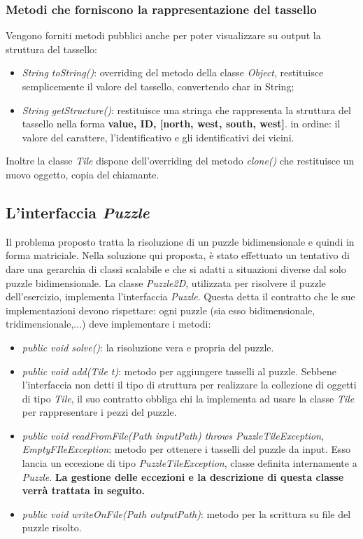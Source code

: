 \documentclass{article}
\begin{document}
\subsubsection{Metodi che forniscono la rappresentazione del tassello}
Vengono forniti metodi pubblici anche per poter visualizzare su output la struttura del tassello:
\begin{itemize}
\item \textit{String toString()}: overriding del metodo della classe \textit{Object}, restituisce semplicemente il valore del tassello, convertendo char in String;
\item \textit{String getStructure()}: restituisce una stringa che rappresenta la struttura del tassello nella forma \textbf{value, ID, [north, west, south, west]}. in ordine: il valore del carattere, l'identificativo e gli identificativi dei vicini.
\end{itemize} 
Inoltre la classe \textit{Tile} dispone dell'overriding del metodo \textit{clone()} che restituisce un nuovo oggetto, copia del chiamante.

\subsection{L'interfaccia \textit{Puzzle}}
Il problema proposto tratta la risoluzione di un puzzle bidimensionale e quindi in forma matriciale. Nella soluzione qui proposta, è stato effettuato un tentativo di dare una gerarchia di classi scalabile e che si adatti a situazioni diverse dal solo puzzle bidimensionale. La classe \textit{Puzzle2D}, utilizzata per risolvere il puzzle dell'esercizio, implementa l'interfaccia \textit{Puzzle}. Questa detta il contratto che le sue implementazioni devono rispettare: ogni puzzle (sia esso bidimensionale, tridimensionale,...) deve implementare i metodi:
\begin{itemize}
\item \textit{public void solve()}: la risoluzione vera e propria del puzzle.
\item \textit{public void add(Tile t)}: metodo per aggiungere tasselli al puzzle. Sebbene l'interfaccia non detti il tipo di struttura per realizzare la collezione di oggetti di tipo \textit{Tile}, il suo contratto obbliga chi la implementa ad usare la classe \textit{Tile} per rappresentare i pezzi del puzzle.
\item \textit{public void readFromFile(Path inputPath) throws PuzzleTileException, EmptyFIleException}: metodo per ottenere i tasselli del puzzle da input. Esso lancia un eccezione di tipo \textit{PuzzleTileException}, classe definita internamente a \textit{Puzzle}. \textbf{La gestione delle eccezioni e la descrizione di questa classe verrà trattata in seguito.}
\item \textit{public void writeOnFile(Path outputPath)}: metodo per la scrittura su file del puzzle risolto.
\end{itemize}
\end{document}
